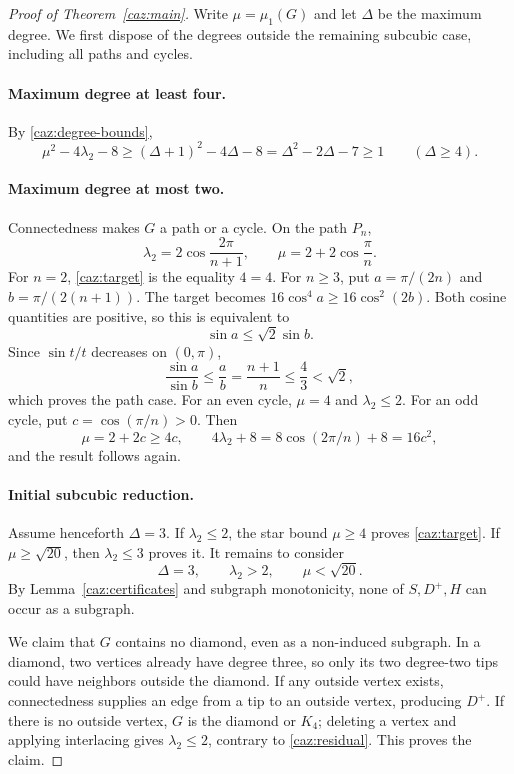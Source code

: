 \documentclass[11pt,a4paper]{article}
\numberwithin{equation}{section}
\theoremstyle{remark}
\begin{document}
\begin{proof}[Proof of Theorem~\ref{caz:main}]
Write $\mu=\mu_1(G)$ and let $\Delta$ be the maximum degree.
We first dispose of the degrees outside the remaining subcubic
case, including all paths and cycles.

\paragraph{Maximum degree at least four.}
By \eqref{caz:degree-bounds},
\[
 \mu^2-4\lambda_2-8
 \ge(\Delta+1)^2-4\Delta-8
 =\Delta^2-2\Delta-7\ge1
 \qquad(\Delta\ge4).
\]

\paragraph{Maximum degree at most two.}
Connectedness makes $G$ a path or a cycle. On the path $P_n$,
\[
 \lambda_2=2\cos\frac{2\pi}{n+1},
 \qquad
 \mu=2+2\cos\frac{\pi}{n}.
\]
For $n=2$, \eqref{caz:target} is the equality $4=4$.
For $n\ge3$, put $a=\pi/(2n)$ and $b=\pi/(2(n+1))$.
The target becomes
$16\cos^4a\ge16\cos^2(2b)$. Both cosine quantities are positive,
so this is equivalent to
\[
 \sin a\le\sqrt2\sin b.
\]
Since $\sin t/t$ decreases on $(0,\pi)$,
\[
 \frac{\sin a}{\sin b}\le\frac ab
 =\frac{n+1}{n}\le\frac43<\sqrt2,
\]
which proves the path case. For an even cycle, $\mu=4$ and
$\lambda_2\le2$. For an odd cycle, put $c=\cos(\pi/n)>0$.
Then
\[
 \mu=2+2c\ge4c,
 \qquad
 4\lambda_2+8=8\cos(2\pi/n)+8=16c^2,
\]
and the result follows again.

\paragraph{Initial subcubic reduction.}
Assume henceforth $\Delta=3$. If $\lambda_2\le2$, the star bound
$\mu\ge4$ proves \eqref{caz:target}. If $\mu\ge\sqrt{20}$,
then $\lambda_2\le3$ proves it. It remains to consider
\begin{equation}
 \Delta=3,
 \qquad \lambda_2>2,
 \qquad \mu<\sqrt{20}.
 \label{caz:residual}
\end{equation}
By Lemma~\ref{caz:certificates} and subgraph monotonicity, none of
$S,D^+,H$ can occur as a subgraph.

We claim that $G$ contains no diamond, even as a non-induced
subgraph. In a diamond, two vertices already have degree three,
so only its two degree-two tips could have neighbors outside the
diamond. If any outside vertex exists, connectedness supplies an
edge from a tip to an outside vertex, producing $D^+$. If there is
no outside vertex, $G$ is the diamond or $K_4$; deleting a vertex
and applying interlacing gives $\lambda_2\le2$, contrary to
\eqref{caz:residual}. This proves the claim.


\end{proof}
\end{document}
